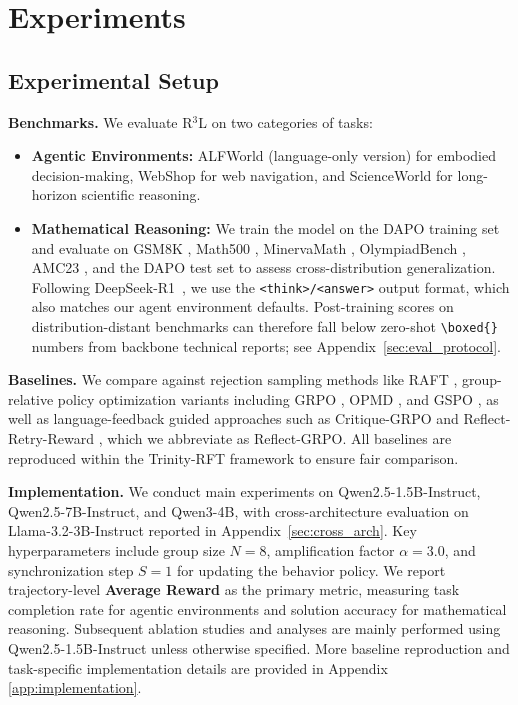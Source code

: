 \documentclass[11pt]{article}
\theoremstyle{definition}
\theoremstyle{remark}
\begin{document}
\section{Experiments}
\subsection{Experimental Setup}
\textbf{Benchmarks.} We evaluate R$^3$L on two categories of tasks:
\begin{itemize}[leftmargin=*,nosep]
    \item \textbf{Agentic Environments:} ALFWorld (language-only version) \cite{shridhar2020alfworld} for embodied decision-making, WebShop \cite{yao2022webshop} for web navigation, and ScienceWorld \cite{wang2022scienceworld} for long-horizon scientific reasoning.
    \item \textbf{Mathematical Reasoning:} We train the model on the DAPO training set and evaluate on GSM8K \cite{cobbe2021training}, Math500 \cite{lightman2023let}, MinervaMath \cite{lewkowycz2022solving}, OlympiadBench \cite{gao2024omni}, AMC23 \cite{amc}, and the DAPO test set \cite{yu2025dapo} to assess cross-distribution generalization. Following DeepSeek-R1~\cite{guo2025deepseek}, we use the \texttt{<think>/<answer>} output format, which also matches our agent environment defaults. Post-training scores on distribution-distant benchmarks can therefore fall below zero-shot \texttt{\textbackslash boxed\{\}} numbers from backbone technical reports; see Appendix~\ref{sec:eval_protocol}.
\end{itemize}

\textbf{Baselines.} We compare against rejection sampling methods like RAFT \cite{dongraft}, group-relative policy optimization variants including GRPO \cite{shao2024deepseekmath}, OPMD \cite{yao2025group}, and GSPO \cite{zheng2025group}, as well as language-feedback guided approaches such as Critique-GRPO \cite{zhang2025critique} and Reflect-Retry-Reward \cite{bensal2025reflect}, which we abbreviate as Reflect-GRPO. All baselines are reproduced within the Trinity-RFT framework \cite{pan2025trinity} to ensure fair comparison.




\textbf{Implementation.} We conduct main experiments on Qwen2.5-1.5B-Instruct, Qwen2.5-7B-Instruct, and Qwen3-4B, with cross-architecture evaluation on Llama-3.2-3B-Instruct reported in Appendix~\ref{sec:cross_arch}. Key hyperparameters include group size $N=8$, amplification factor $\alpha=3.0$, and synchronization step $S=1$ for updating the behavior policy. We report trajectory-level \textbf{Average Reward} as the primary metric, measuring task completion rate for agentic environments and solution accuracy for mathematical reasoning. Subsequent ablation studies and analyses are mainly performed using Qwen2.5-1.5B-Instruct unless otherwise specified. More baseline reproduction and task-specific implementation details are provided in Appendix \ref{app:implementation}.
\end{document}
